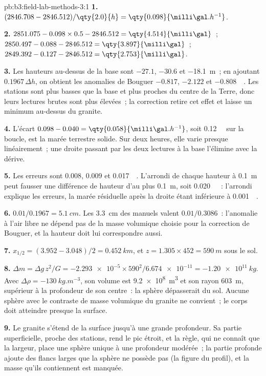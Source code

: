 \begin{solution}{pb:b3:field-lab-methods-3:1}
\textbf{1.} $(2846.708 - 2846.512)/\qty{2.0}{h} = \qty{0.098}{\milli\gal.h^{-1}}$.

\textbf{2.} $2851.075 - 0.098\times0.5 - 2846.512 = \qty{4.514}{\milli\gal}$~;
$2850.497 - 0.088 - 2846.512 = \qty{3.897}{\milli\gal}$~;
$2849.392 - 0.127 - 2846.512 = \qty{2.753}{\milli\gal}$.

\textbf{3.} Les hauteurs au-dessus de la base sont $-27.1$, $-30.6$ et
\qty{-18.1}{m}~; en ajoutant $0.1967\,\Delta h$, on obtient les anomalies de Bouguer
$\num{-0.817}$, $\num{-2.122}$ et \qty{-0.808}{\milli\gal}. Les
stations sont plus basses que la base et plus proches du centre de la Terre,
donc leurs lectures brutes sont plus élevées~; la correction retire cet effet et
laisse un minimum au-dessus du granite.

\textbf{4.} L'écart $0.098 - 0.040 = \qty{0.058}{\milli\gal.h^{-1}}$,
soit \qty{0.12}{\milli\gal} sur la boucle, est la marée terrestre solide. Sur deux
heures, elle varie presque linéairement~; une droite passant par les deux
lectures à la base l'élimine avec la dérive.

\textbf{5.} Les erreurs sont $\num{0.008}$, $\num{0.009}$ et
\qty{0.017}{\milli\gal}. L'arrondi de chaque hauteur à \qty{0.1}{m} peut fausser
une différence de hauteur d'au plus \qty{0.1}{m}, soit
\qty{0.020}{\milli\gal}~: l'arrondi explique les erreurs, la marée
résiduelle après la droite étant inférieure à \qty{0.001}{\milli\gal}.

\textbf{6.} $0.01/0.1967 = \qty{5.1}{cm}$. Les \qty{3.3}{cm} des manuels valent
$0.01/0.3086$~: l'anomalie à l'air libre ne dépend pas de la masse volumique
choisie pour la correction de Bouguer, et la hauteur doit lui correspondre aussi.

\textbf{7.} $x_{1/2} = (3.952 - 3.048)/2 = \qty{0.452}{km}$, et $z = 1.305
\times452 = \qty{590}{m}$ sous le sol.

\textbf{8.} $\Delta m = \Delta g\,z^2/G = \num{-2.293e-5}\times590^2/
\num{6.674e-11} = \qty{-1.20e11}{kg}$. Avec $\Delta\rho =
\qty{-130}{kg.m^{-3}}$, son volume est \qty{9.2e8}{m^3} et son rayon
\qty{603}{m}, supérieur à la profondeur de son centre~: la sphère dépasserait
du sol. Aucune sphère avec le contraste de masse volumique du granite
ne convient~; le corps doit atteindre presque la surface.

\textbf{9.} Le granite s'étend de la surface jusqu'à une grande profondeur. Sa partie
superficielle, proche des stations, rend le pic étroit, et la règle, qui
ne connaît que la largeur, place une sphère unique à une profondeur modérée~; la
partie profonde ajoute des flancs larges que la sphère ne possède pas (la figure du
profil), et la masse qu'ils contiennent est manquée.


\end{solution}

